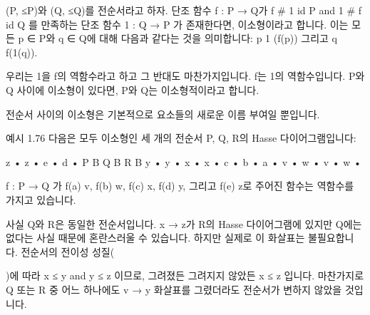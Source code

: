 \documentclass[11pt, a4paper, twoside, openany]{book}
\begin{document}
\par\medskip
\begin{definitionbox}[정의 1.75]
(P, ≤P)와 (Q, ≤Q)를 전순서라고 하자. 단조 함수 f : P → Q\hspace{0pt}가  f \# 1  id P and 1 \# f  id Q 를 만족하는 단조 함수 1 : Q → P 가 존재한다면, 이소형이라고 합니다. 이는 모든 p ∈ P\hspace{0pt}와 q ∈ Q\hspace{0pt}에 대해 다음과 같다는 것을 의미합니다:
p  1 (f(p))
그리고
q  f(1(q)).
\end{definitionbox}

\par\medskip
우리는 1\hspace{0pt}을 f\hspace{0pt}의 역함수라고 하고 그 반대도 마찬가지입니다. f\hspace{0pt}는 1\hspace{0pt}의 역함수입니다.
P\hspace{0pt}와 Q 사이에 이소형이 있다면, P\hspace{0pt}와 Q\hspace{0pt}는 이소형적이라고 합니다.

\par\medskip
전순서 사이의 이소형은 기본적으로 요소들의 새로운 이름 부여일 뿐입니다.

\par\medskip
예시 1.76
다음은 모두 이소형인 세 개의 전순서 P, Q, R\hspace{0pt}의 Hasse 다이어그램입니다:

\par\medskip
z •
z •
e •
d •
P B
Q B
R B
y
•
y
•
x •
x •
c •
b •
a •
v •
w •
v •
w •

\par\medskip
f : P → Q 가 f(a)  v, f(b)  w, f(c)  x, f(d)  y, 그리고 f(e)  z\hspace{0pt}로 주어진 함수는 역함수를 가지고 있습니다.

\par\medskip
사실 Q\hspace{0pt}와 R\hspace{0pt}은 동일한 전순서입니다. x → z\hspace{0pt}가 R\hspace{0pt}의 Hasse 다이어그램에 있지만 Q\hspace{0pt}에는 없다는 사실 때문에 혼란스러울 수 있습니다. 하지만 실제로 이 화살표는 불필요합니다. 전순서의 전이성 성질(
\begin{definitionbox}[정의 1.30]
)에 따라 x ≤ y and y ≤ z 이므로, 그려졌든 그려지지 않았든 x ≤ z 입니다. 마찬가지로 Q 또는 R 중 어느 하나에도 v → y 화살표를 그렸더라도 전순서가 변하지 않았을 것입니다.
\end{definitionbox}
\end{document}
